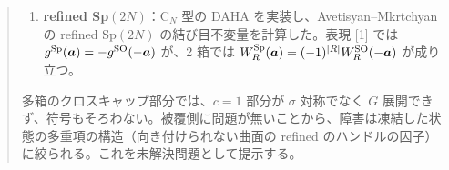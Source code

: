 \begin{abstract}
\begin{enumerate}
\item \textbf{refined Sp$(2N)$}：C$_N$ 型の DAHA を実装し、Avetisyan--Mkrtchyan の refined Sp$(2N)$ の結び目不変量を計算した。表現 [1] では $g^{\mathrm{Sp}}(\ba) = -g^{\SO}(-\ba)$ が、2 箱では $W^{\mathrm{Sp}}_R(\ba) = (-1)^{|R|}W^{\SO}_R(-\ba)$ が成り立つ。
\end{enumerate}
多箱のクロスキャップ部分では、$c = 1$ 部分が $\sigma$ 対称でなく $G$ 展開できず、符号もそろわない。被覆側に問題が無いことから、障害は凍結した状態の多重項の構造（向き付けられない曲面の refined のハンドルの因子）に絞られる。これを未解決問題として提示する。
\end{abstract}
